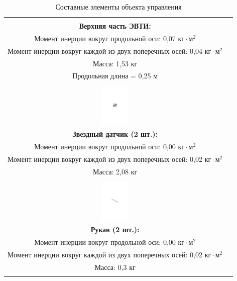 \begin{table}[h!]
\begin{tabular}{|c|c|}
            \shortstack[l] {
                \rule{0pt}{2mm} \\
                \textbf{Верхняя часть ЭВТИ:} \\
                Момент инерции вокруг продольной оси: 0,07 $\text{кг} \cdot \text{м}^{2}$ \\
                Момент инерции вокруг каждой из двух поперечных  осей: 0,04 $\text{кг} \cdot \text{м}^{2}$ \\
                Масса: 1,53 кг \\
                Продольная длина = 0,25 м \\
                \rule{0pt}{2mm}
            } \\
        \hline
            \includegraphics[height=20mm, keepaspectratio]{./src/pictures/sattelite_3d_images/star_sensor} &
            \shortstack[l] {
                \rule{0pt}{2mm} \\
                \textbf{Звездный датчик (2 шт.):} \\
                Момент инерции вокруг продольной оси: 0,00 $\text{кг} \cdot \text{м}^{2}$ \\
                Момент инерции вокруг каждой из двух поперечных  осей: 0,02 $\text{кг} \cdot \text{м}^{2}$ \\
                Масса: 2,08 кг \\
                \rule{0pt}{2mm}
            } \\
        \hline
            \includegraphics[height=20mm, keepaspectratio]{./src/pictures/sattelite_3d_images/sleeve} &
            \shortstack[l] {
                \rule{0pt}{2mm} \\
                \textbf{Рукав (2 шт.):} \\
                Момент инерции вокруг продольной оси: 0,00 $\text{кг} \cdot \text{м}^{2}$ \\
                Момент инерции вокруг каждой из двух поперечных  осей: 0,02 $\text{кг} \cdot \text{м}^{2}$ \\
                Масса: 0,3 кг \\
                \rule{0pt}{2mm}
            } \\
        \hline
    \end{tabular}

    \caption{Составные элементы объекта управления}
\end{table}

